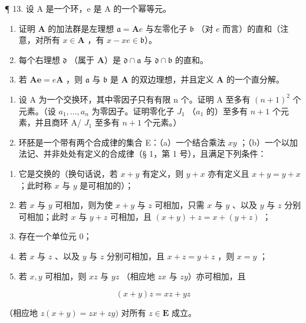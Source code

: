 ¶ 13. 设 A 是一个环，e 是 A 的一个幂等元。

\begin{enumerate}
\def\labelenumi{(\alph{enumi})}
\item
  证明 \(\mathbf{A}\) 的加法群是左理想 \(\mathfrak{a} = \mathbf{A}e\) 与左零化子 \(\mathfrak{b}\) （对 \(e\) 而言）的直和（注意，对所有 \(x\in \mathbf{A}\) ，有 \(x - xe\in \mathfrak{b}\)）。
\item
  每个右理想 \(\mathfrak{d}\) （属于 \(\mathbf{A}\)）是 \(\mathfrak{d} \cap \mathfrak{a}\) 与 \(\mathfrak{d} \cap \mathfrak{b}\) 的直和。
\item
  若 \(\mathbf{Ae} = e\mathbf{A}\) ，则 \(\mathfrak{a}\) 与 \(\mathfrak{b}\) 是 \(\mathbf{A}\) 的双边理想，并且定义 \(\mathbf{A}\) 的一个直分解。
\end{enumerate}

\begin{enumerate}
\def\labelenumi{\arabic{enumi}.}
\setcounter{enumi}{13}
\item
  设 A 为一个交换环，其中零因子只有有限 n 个。证明 A 至多有 \((n+1)^{2}\) 个元素。（设 \(a_{1},\ldots,a_{n}\) 为零因子。证明零化子 \(J_{1}\) （\(a_{1}\) 的）至多有 \(n+1\) 个元素，并且商环 A/ \(J_{1}\) 至多有 \(n+1\) 个元素。）
\item
  环胚是一个带有两个合成律的集合 E：（a）一个结合乘法 \(xy\) ；（b）一个以加法记、并非处处有定义的合成律（§ 1，第 1 号），且满足下列条件：
\end{enumerate}

\begin{enumerate}
\def\labelenumi{(\arabic{enumi})}
\item
  它是交换的（换句话说，若 \(x + y\) 有定义，则 \(y + x\) 亦有定义且 \(x + y = y + x\) ；此时称 \(x\) 与 \(y\) 是可相加的）；
\item
  若 \(x\) 与 \(y\) 可相加，则为使 \(x + y\) 与 \(z\) 可相加，只需 \(x\) 与 \(y\) 、以及 \(y\) 与 \(z\) 分别可相加；此时 \(x\) 与 \(y + z\) 可相加，且 \((x + y) + z = x + (y + z)\) ；
\item
  存在一个单位元 0；
\item
  若 \(x\) 与 \(z\) 、以及 \(y\) 与 \(z\) 分别可相加，且 \(x + z = y + z\) ，则 \(x = y\) ；
\item
  若 \(x, y\) 可相加，则 \(xz\) 与 \(yz\) （相应地 \(zx\) 与 \(zy\)）亦可相加，且
\end{enumerate}

\[
(x + y) z = x z + y z
\]

（相应地 \(z(x + y) = zx + zy)\) 对所有 \(z \in \mathbf{E}\) 成立。

